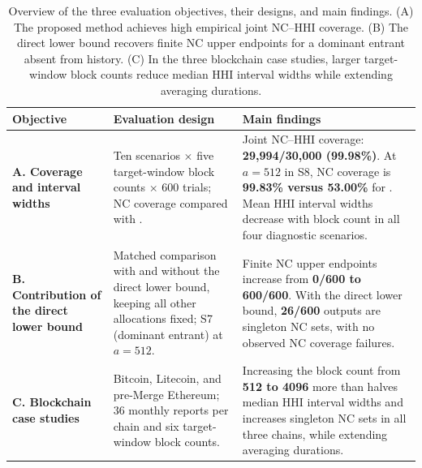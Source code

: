 \begin{table}[!t]
\centering
\small
\caption{Overview of the three evaluation objectives, their designs, and main findings. (A) The proposed method achieves high empirical joint NC--HHI coverage. (B) The direct lower bound recovers finite NC upper endpoints for a dominant entrant absent from history. (C) In the three blockchain case studies, larger target-window block counts reduce median HHI interval widths while extending averaging durations.}
\label{tab:comparison-design}
\setlength{\tabcolsep}{5pt}
\renewcommand{\arraystretch}{1.12}
\begin{tabular}{@{}>{\raggedright\arraybackslash}p{}>{\raggedright\arraybackslash}p{}>{\raggedright\arraybackslash}p{}@{}}
\toprule
Objective & Evaluation design & Main findings \\
\midrule
\textbf{A. Coverage and interval widths} & Ten scenarios $\times$ five target-window block counts $\times$ 600 trials; NC coverage compared with \milad{}. & Joint NC--HHI coverage: \textbf{29,994/30,000 (99.98\%)}. At $a=512$ in S8, NC coverage is \textbf{99.83\% versus 53.00\%} for \milad{}. Mean HHI interval widths decrease with block count in all four diagnostic scenarios. \\
\addlinespace[3pt]
\textbf{B. Contribution of the direct lower bound} & Matched comparison with and without the direct lower bound, keeping all other allocations fixed; S7 (dominant entrant) at $a=512$. & Finite NC upper endpoints increase from \textbf{0/600 to 600/600}. With the direct lower bound, \textbf{26/600} outputs are singleton NC sets, with no observed NC coverage failures. \\
\addlinespace[3pt]
\textbf{C. Blockchain case studies} & Bitcoin, Litecoin, and pre-Merge Ethereum; 36 monthly reports per chain and six target-window block counts. & Increasing the block count from \textbf{512 to 4096} more than halves median HHI interval widths and increases singleton NC sets in all three chains, while extending averaging durations. \\
\bottomrule
\end{tabular}
\end{table}
